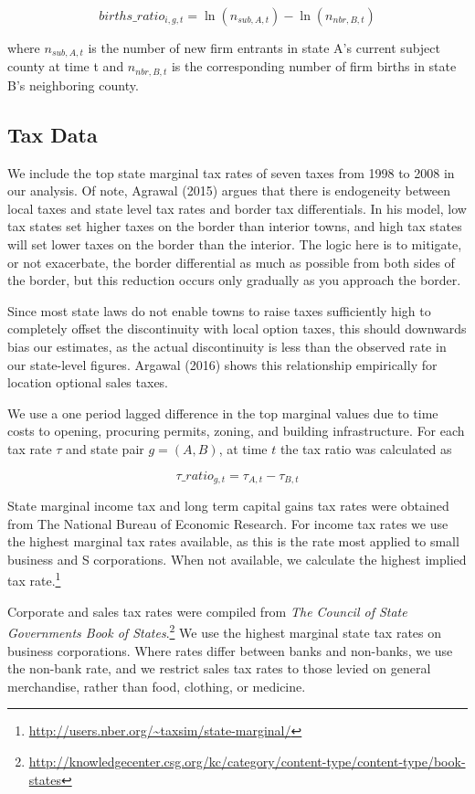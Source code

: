 \documentclass[12pt,a4paper]{article}
\begin{document}
\begin{equation} births\_ratio_{i,g,t} = \ln(n_{sub,A,t})-\ln(n_{nbr,B,t})\end{equation}

where $n_{sub,A,t}$ is the number of new firm entrants in state A's current subject county at time t and  $n_{nbr,B,t}$ is the corresponding number of firm births in state B's neighboring county.

\subsection{Tax Data}

We include the top state marginal tax rates of seven taxes from 1998 to 2008 in our analysis. Of note, Agrawal (2015) argues that there is endogeneity between local taxes and state level tax rates and border tax differentials. In his model, low tax states set higher taxes on the border than interior towns, and high tax states will set lower taxes on the border than the interior. The logic here is to mitigate, or not exacerbate, the border differential as much as possible from both sides of the border, but this reduction occurs only gradually as you approach the border. 

Since most state laws do not enable towns to raise taxes sufficiently high to completely offset the discontinuity with local option taxes, this should downwards bias our estimates, as the actual discontinuity is less than the observed rate in our state-level figures. Argawal (2016) shows this relationship empirically for location optional sales taxes.

We use a one period lagged difference in the top marginal values due to time costs to opening, procuring permits, zoning, and building infrastructure. For each tax rate $\tau$ and state pair $g = (A,B)$, at time $t$ the tax ratio was calculated as

\begin{equation} \tau\_ratio_{g,t} = \tau_{A,t}-\tau_{B,t} \end{equation}

State marginal income tax and long term capital gains tax rates were obtained from The National Bureau of Economic Research. For income tax rates we use the highest marginal tax rates available, as this is the rate most applied to small business and S corporations. When not available, we calculate the highest implied tax rate.\footnote{\url{http://users.nber.org/~taxsim/state-marginal/}}

Corporate and sales tax rates were compiled from \textit{The Council of State Governments Book of States}.\footnote{\url{http://knowledgecenter.csg.org/kc/category/content-type/content-type/book-states}} We use the highest marginal state tax rates on business corporations. Where rates differ between banks and non-banks, we use the non-bank rate, and we restrict sales tax rates to those levied on general merchandise, rather than food, clothing, or medicine.
\end{document}
